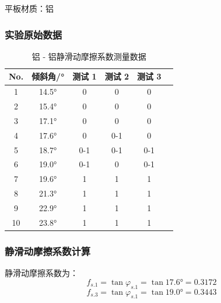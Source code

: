 平板材质：铝
\subsubsection{实验原始数据}

\begin{table}[h!]
    \centering
    \renewcommand{\arraystretch}{1.5}
    \setlength{\tabcolsep}{8pt}
    \begin{tabular}{|c|c|c|c|c|c|}
    \hline
    \textbf{No.} & \textbf{倾斜角/°} & 测试 1 & 测试 2 & 测试 3 \\ \hline
    1 & 14.5° & 0 & 0 & 0 \\ \hline
    2 & 15.4° & 0 & 0 & 0 \\ \hline
    3 & 17.1° & 0 & 0 & 0 \\ \hline
    4 & 17.6° & 0 & 0-1 & 0 \\ \hline
    5 & 18.7° & 0-1 & 0-1 & 0-1 \\ \hline
    6 & 19.0° & 0-1 & 0 & 0-1\\ \hline
    7 & 19.6° & 1 & 1 & 1 \\ \hline
    8 & 21.3° & 1 & 1 & 1 \\ \hline
    9 & 22.9° & 1 & 1 & 1 \\ \hline
    10 & 23.8° & 1 &1 & 1 \\ \hline
    \end{tabular}
    \caption{铝 - 铝静滑动摩擦系数测量数据}
    \label{tab:static_friction_data}
\end{table}

\subsubsection{静滑动摩擦系数计算}
静滑动摩擦系数为：
$$  
f_{s.1}=\tan \varphi_{s.1}=\tan 17.6°=0.3172
$$ 
$$ 
f_{s.3}=\tan \varphi_{s.1}=\tan 19.0°=0.3443
$$

